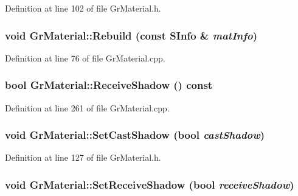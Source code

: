 \begin{CompactItemize}
Definition at line 102 of file GrMaterial.h.\hypertarget{class_gr_material_c259581fc8c8a6485d0a103a6007271b}{
\subsubsection[{Rebuild}]{\setlength{\rightskip}{0pt plus 5cm}void GrMaterial::Rebuild (const {\bf SInfo} \& {\em matInfo})}}
\label{class_gr_material_c259581fc8c8a6485d0a103a6007271b}




Definition at line 76 of file GrMaterial.cpp.\hypertarget{class_gr_material_c4ef3f9a72931e59ce603dc68b2d1317}{
\subsubsection[{ReceiveShadow}]{\setlength{\rightskip}{0pt plus 5cm}bool GrMaterial::ReceiveShadow () const}}
\label{class_gr_material_c4ef3f9a72931e59ce603dc68b2d1317}




Definition at line 261 of file GrMaterial.cpp.\hypertarget{class_gr_material_a45596ed0f7f0ddfffcde7169f7a4975}{
\subsubsection[{SetCastShadow}]{\setlength{\rightskip}{0pt plus 5cm}void GrMaterial::SetCastShadow (bool {\em castShadow})}}
\label{class_gr_material_a45596ed0f7f0ddfffcde7169f7a4975}




Definition at line 127 of file GrMaterial.h.\hypertarget{class_gr_material_31e817784139a59b314f36f761ea0031}{
\subsubsection[{SetReceiveShadow}]{\setlength{\rightskip}{0pt plus 5cm}void GrMaterial::SetReceiveShadow (bool {\em receiveShadow})}}
\label{class_gr_material_31e817784139a59b314f36f761ea0031}





\end{CompactItemize}
